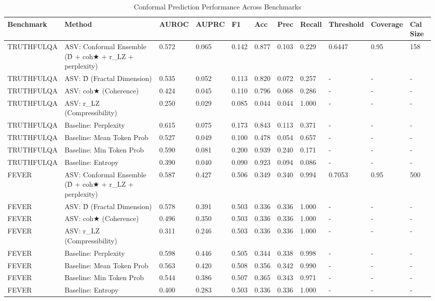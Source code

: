 \begin{table}[htbp]
\centering
\caption{Conformal Prediction Performance Across Benchmarks}
\label{tab:conformal_results}
\begin{tabular}{lllllllllll}
\toprule
Benchmark & Method & AUROC & AUPRC & F1 & Acc & Prec & Recall & Threshold & Coverage & Cal Size \\
\midrule
TRUTHFULQA & ASV: Conformal Ensemble (D̂ + coh★ + r_LZ + perplexity) & 0.572 & 0.065 & 0.142 & 0.877 & 0.103 & 0.229 & 0.6447 & 0.95 & 158 \\
TRUTHFULQA & ASV: D̂ (Fractal Dimension) & 0.535 & 0.052 & 0.113 & 0.820 & 0.072 & 0.257 & - & - & - \\
TRUTHFULQA & ASV: coh★ (Coherence) & 0.424 & 0.045 & 0.110 & 0.796 & 0.068 & 0.286 & - & - & - \\
TRUTHFULQA & ASV: r_LZ (Compressibility) & 0.250 & 0.029 & 0.085 & 0.044 & 0.044 & 1.000 & - & - & - \\
TRUTHFULQA & Baseline: Perplexity & 0.615 & 0.075 & 0.173 & 0.843 & 0.113 & 0.371 & - & - & - \\
TRUTHFULQA & Baseline: Mean Token Prob & 0.527 & 0.049 & 0.100 & 0.478 & 0.054 & 0.657 & - & - & - \\
TRUTHFULQA & Baseline: Min Token Prob & 0.590 & 0.081 & 0.200 & 0.939 & 0.240 & 0.171 & - & - & - \\
TRUTHFULQA & Baseline: Entropy & 0.390 & 0.040 & 0.090 & 0.923 & 0.094 & 0.086 & - & - & - \\
FEVER & ASV: Conformal Ensemble (D̂ + coh★ + r_LZ + perplexity) & 0.587 & 0.427 & 0.506 & 0.349 & 0.340 & 0.994 & 0.7053 & 0.95 & 500 \\
FEVER & ASV: D̂ (Fractal Dimension) & 0.578 & 0.391 & 0.503 & 0.336 & 0.336 & 1.000 & - & - & - \\
FEVER & ASV: coh★ (Coherence) & 0.496 & 0.350 & 0.503 & 0.336 & 0.336 & 1.000 & - & - & - \\
FEVER & ASV: r_LZ (Compressibility) & 0.311 & 0.246 & 0.503 & 0.336 & 0.336 & 1.000 & - & - & - \\
FEVER & Baseline: Perplexity & 0.598 & 0.446 & 0.505 & 0.344 & 0.338 & 0.998 & - & - & - \\
FEVER & Baseline: Mean Token Prob & 0.563 & 0.420 & 0.508 & 0.356 & 0.342 & 0.990 & - & - & - \\
FEVER & Baseline: Min Token Prob & 0.544 & 0.386 & 0.507 & 0.365 & 0.343 & 0.971 & - & - & - \\
FEVER & Baseline: Entropy & 0.400 & 0.283 & 0.503 & 0.336 & 0.336 & 1.000 & - & - & - \\

\end{tabular}
\end{table}
